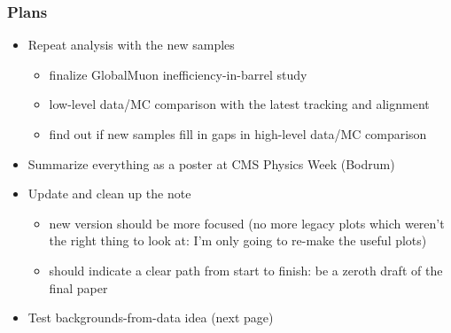 \documentclass[compress]{beamer}
\begin{document}
\begin{frame}
\frametitle{Plans}
\begin{itemize}
\item Repeat analysis with the new samples
\begin{itemize}
\item finalize GlobalMuon inefficiency-in-barrel study
\item low-level data/MC comparison with the latest tracking and alignment
\item find out if new samples fill in gaps in high-level data/MC comparison
\end{itemize}

\item Summarize everything as a poster at CMS Physics Week (Bodrum)

\item Update and clean up the note
\begin{itemize}
\item new version should be more focused (no more legacy plots which weren't the right thing to look at: I'm only going to re-make the useful plots)
\item should indicate a clear path from start to finish: be a zeroth draft of the final paper
\end{itemize}

\item Test backgrounds-from-data idea (next page)
\end{itemize}
\end{frame}

\end{document}
